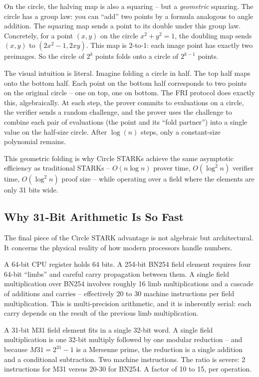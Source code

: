\documentclass[
  11pt,
  openany]{report}
\begin{document}
On the circle, the halving map is also a squaring -- but a \emph{geometric}
squaring. The circle has a group law: you can ``add'' two points by a formula
analogous to angle addition. The squaring map sends a point to its double under
this group law. Concretely, for a point \((x, y)\) on the circle
\(x^2 + y^2 = 1\), the doubling map sends \((x, y)\) to \((2x^2 - 1, 2xy)\).
This map is 2-to-1: each image point has exactly two preimages. So the circle of
\(2^k\) points folds onto a circle of \(2^{k-1}\) points.

The visual intuition is literal. Imagine folding a circle in half. The top half
maps onto the bottom half. Each point on the bottom half corresponds to two
points on the original circle -- one on top, one on bottom. The FRI protocol
does exactly this, algebraically. At each step, the prover commits to
evaluations on a circle, the verifier sends a random challenge, and the prover
uses the challenge to combine each pair of evaluations (the point and its ``fold
partner'') into a single value on the half-size circle. After \(\log(n)\) steps,
only a constant-size polynomial remains.

This geometric folding is why Circle STARKs achieve the same asymptotic
efficiency as traditional STARKs -- \(O(n \log n)\) prover time, \(O(\log^2 n)\)
verifier time, \(O(\log^2 n)\) proof size -- while operating over a field where
the elements are only 31 bits wide.

\subsection{Why 31-Bit Arithmetic Is So
Fast}\label{why-31-bit-arithmetic-is-so-fast}

The final piece of the Circle STARK advantage is not algebraic but
architectural. It concerns the physical reality of how modern processors handle
numbers.

A 64-bit CPU register holds 64 bits. A 254-bit BN254 field element requires four
64-bit ``limbs'' and careful carry propagation between them. A single field
multiplication over BN254 involves roughly 16 limb multiplications and a cascade
of additions and carries -- effectively 20 to 30 machine instructions per field
multiplication. This is multi-precision arithmetic, and it is inherently serial:
each carry depends on the result of the previous limb multiplication.

A 31-bit M31 field element fits in a single 32-bit word. A single field
multiplication is one 32-bit multiply followed by one modular reduction -- and
because \(M31 = 2^{31} - 1\) is a Mersenne prime, the reduction is a single
addition and a conditional subtraction. Two machine instructions. The ratio is
severe: 2 instructions for M31 versus 20-30 for BN254. A factor of 10 to 15, per
operation.
\end{document}
